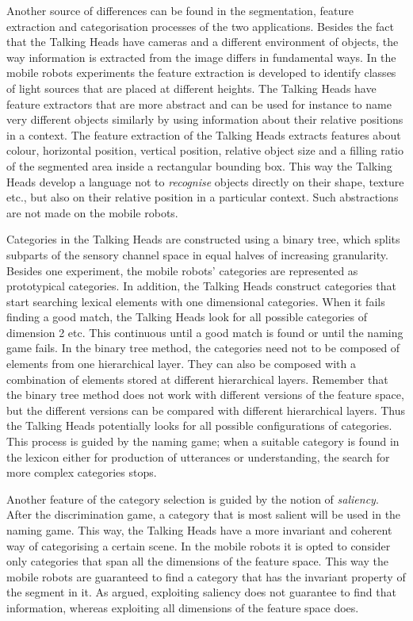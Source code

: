 Another source of differences can be found in the segmentation, feature extraction and categorisation processes of the two applications. Besides the fact that the Talking Heads have cameras and a different environment of objects, the way information is extracted from the image differs in fundamental ways. In the mobile robots experiments the feature extraction is developed to identify classes of light sources that are placed at different heights. The Talking Heads have feature extractors that are more abstract and can be used for instance to name very different objects similarly by using information about their relative positions in a context. The feature extraction of the Talking Heads extracts features about colour, horizontal position, vertical position, relative object size and a filling ratio of the segmented area inside a rectangular bounding box. This way the Talking Heads develop a language not to {\em recognise} objects directly on their shape, texture etc., but also on their relative position in a particular context. Such abstractions are not made on the mobile robots. 

Categories in the Talking Heads are constructed using a binary tree, which splits subparts of the sensory channel space in equal halves of increasing granularity. Besides one experiment, the mobile robots' categories are represented as prototypical categories. In addition, the Talking Heads construct categories that start searching lexical elements with one dimensional categories. When it fails finding a good match, the Talking Heads look for all possible categories of dimension 2 etc. This continuous until a good match is found or until the naming game fails. In the binary tree method, the categories need not to be composed of elements from one hierarchical layer. They can also be composed with a combination of elements stored at different hierarchical layers. Remember that the binary tree method does not work with different versions of the feature space, but the different versions can be compared with different hierarchical layers. Thus the Talking Heads potentially looks for all possible configurations of categories. This process is guided by the naming game; when a suitable category is found in the lexicon either for production of utterances or understanding, the search for more complex categories stops.

Another feature of the category selection is guided by the notion of {\em saliency}. After the discrimination game, a category that is most salient will be used in the naming game. This way, the Talking Heads have a more invariant and coherent way of categorising a certain scene. In the mobile robots it is opted to consider only categories that span all the dimensions of the feature space. This way the mobile robots are guaranteed to find a category that has the invariant property of the segment in it. As argued, exploiting saliency does not guarantee to find that information, whereas exploiting all dimensions of the feature space does.

